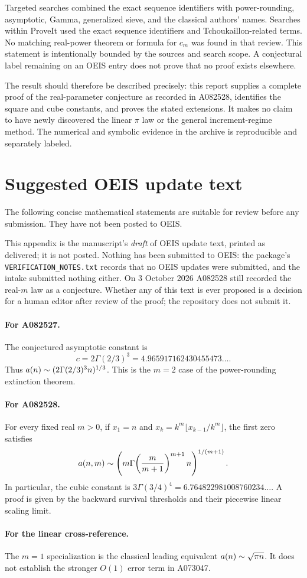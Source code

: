 Targeted searches combined the exact sequence identifiers with
power-rounding, asymptotic, Gamma, generalized sieve, and the
classical authors' names. Searches within ProveIt used the exact
sequence identifiers and Tchoukaillon-related terms. No matching
real-power theorem or formula for $c_m$ was found in that review.
This statement is intentionally bounded by the sources and search
scope. A conjectural label remaining on an OEIS entry does not prove
that no proof exists elsewhere.

The result should therefore be described precisely: this report
supplies a complete proof of the real-parameter conjecture as
recorded in A082528, identifies the square and cube constants, and
proves the stated extensions. It makes no claim to have newly
discovered the linear $\pi$ law or the general increment-regime
method. The numerical and symbolic evidence in the archive is
reproducible and separately labeled.

\section{Suggested OEIS update text}\label{rex:app:oeis}

The following concise mathematical statements are suitable for
review before any submission. They have not been posted to OEIS.

\begin{writenote}
This appendix is the manuscript's \emph{draft} of OEIS update text, printed
as delivered; it is not posted. Nothing has been submitted to OEIS: the
package's \texttt{VERIFICATION\_NOTES.txt} records that no OEIS updates were
submitted, and the intake submitted nothing either. On 3 October 2026
A082528 still recorded the real-$m$ law as a conjecture. Whether any
of this text is ever proposed is a decision for a human editor after review
of the proof; the repository does not submit it.
\end{writenote}

\paragraph{For A082527.}
The conjectured asymptotic constant is
\[
c=2\Gamma(2/3)^3=4.965917162430455473\ldots.
\]
Thus $a(n)\mathrel{\sim}(2\Gamma(2/3)^3n)^{1/3}$.
This is the $m=2$ case of the power-rounding extinction theorem.

\paragraph{For A082528.}
For every fixed real $m>0$, if $x_1=n$ and
$x_k=k^m\lfloor x_{k-1}/k^m\rfloor$, the first zero satisfies
\[
 a(n,m)\mathrel{\sim}
 \left(m\Gamma\!\left(\frac{m}{m+1}\right)^{m+1}n\right)^{1/(m+1)}.
\]
In particular, the cubic constant is
$3\Gamma(3/4)^4=6.764822981008760234\ldots$.
A proof is given by the backward survival thresholds and their
piecewise linear scaling limit.

\paragraph{For the linear cross-reference.}
The $m=1$ specialization is the classical leading equivalent
$a(n)\mathrel{\sim}\sqrt{\pi n}$. It does not establish the stronger $O(1)$
error term in A073047.

\clearpage
